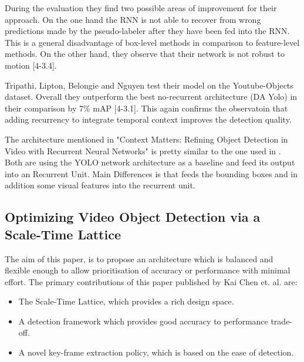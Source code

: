 \documentclass[conference]{IEEEtran}
\begin{document}
During the evaluation they find two possible areas of improvement for their approach. On the one hand the RNN is not able to recover from wrong predictions made by the pseudo-labeler after they have been fed into the RNN. This is a general disadvantage of box-level methods in comparison to feature-level methods. On the other hand, they observe that their network is not robust to motion [4-3.4]. \newline

Tripathi, Lipton, Belongie and Nguyen test their model on the Youtube-Objects dataset. Overall they outperform the best no-recurrent architecture (DA Yolo) in their comparison by 7\% mAP [4-3.1]. This again confirms the observatoin that adding recurrency to integrate temporal context improves the detection quality.  \newline

The architecture mentioned in "Context Matters: Refining Object Detection in Video with Recurrent Neural Networks" is pretty similar to the one used in \cite{b4}. Both are using the YOLO network architecture as a baseline and feed its output into an Recurrent Unit. Main Differences is that \cite{b4} feeds the bounding boxes and in addition some visual features into the recurrent unit.  

\subsection{Optimizing Video Object Detection via a Scale-Time Lattice\cite{b10}}

The aim of this paper, is to propose an architecture which is balanced and flexible enough to allow prioritisation of accuracy or performance with minimal effort. The primary contributions of this paper published by Kai Chen et. al. are:
\begin{itemize}
	\item The Scale-Time Lattice, which provides a rich design space.
	\item A detection framework which provides good accuracy to performance trade-off.
	\item A novel key-frame extraction policy, which is based on the ease of detection.
\end{itemize}
\end{document}
